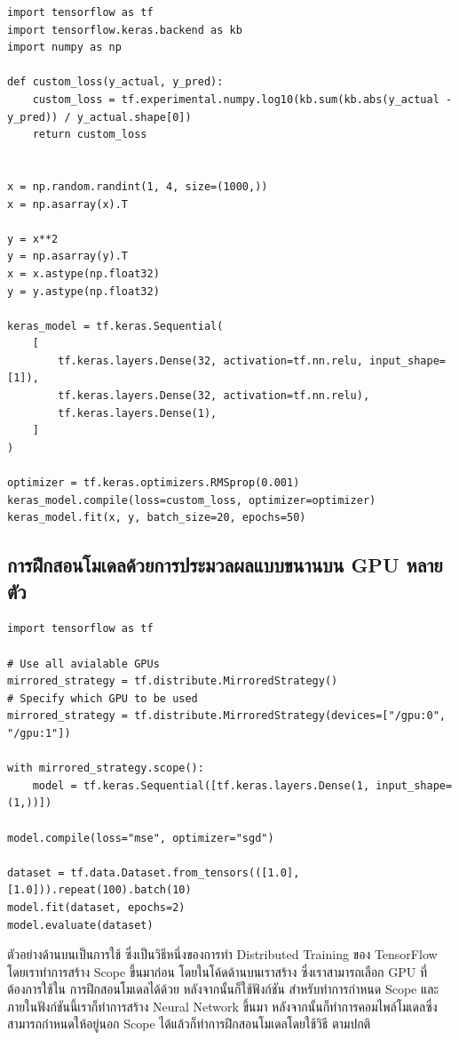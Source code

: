 \begin{lstlisting}[style=MyPython]
import tensorflow as tf
import tensorflow.keras.backend as kb
import numpy as np

def custom_loss(y_actual, y_pred):
    custom_loss = tf.experimental.numpy.log10(kb.sum(kb.abs(y_actual - y_pred)) / y_actual.shape[0])
    return custom_loss


x = np.random.randint(1, 4, size=(1000,))
x = np.asarray(x).T

y = x**2
y = np.asarray(y).T
x = x.astype(np.float32)
y = y.astype(np.float32)

keras_model = tf.keras.Sequential(
    [
        tf.keras.layers.Dense(32, activation=tf.nn.relu, input_shape=[1]),
        tf.keras.layers.Dense(32, activation=tf.nn.relu),
        tf.keras.layers.Dense(1),
    ]
)

optimizer = tf.keras.optimizers.RMSprop(0.001)
keras_model.compile(loss=custom_loss, optimizer=optimizer)
keras_model.fit(x, y, batch_size=20, epochs=50)
\end{lstlisting}

\subsection{การฝึกสอนโมเดลด้วยการประมวลผลแบบขนานบน GPU หลายตัว}

\begin{lstlisting}[style=MyPython]
import tensorflow as tf

# Use all avialable GPUs
mirrored_strategy = tf.distribute.MirroredStrategy()
# Specify which GPU to be used
mirrored_strategy = tf.distribute.MirroredStrategy(devices=["/gpu:0", "/gpu:1"])

with mirrored_strategy.scope():
    model = tf.keras.Sequential([tf.keras.layers.Dense(1, input_shape=(1,))])

model.compile(loss="mse", optimizer="sgd")

dataset = tf.data.Dataset.from_tensors(([1.0], [1.0])).repeat(100).batch(10)
model.fit(dataset, epochs=2)
model.evaluate(dataset)
\end{lstlisting}

ตัวอย่างด้านบนเป็นการใช้  ซึ่งเป็นวิธีหนึ่งของการทำ Distributed Training ของ TensorFlow 
โดยเราทำการสร้าง Scope ขึ้นมาก่อน โดยในโค้ดด้านบนเราสร้าง  ซึ่งเราสามารถเลือก GPU ที่ต้องการใช้ใน%
การฝึกสอนโมเดลได้ด้วย หลังจากนั้นก็ใช้ฟังก์ชัน  สำหรับทำการกำหนด Scope และภายในฟังก์ชันนี้เราก็ทำการสร้าง Neural 
Network ขึ้นมา หลังจากนั้นก็ทำการคอมไพล์โมเดลซึ่งสามารถกำหนดให้อยู่นอก Scope ได้แล้วก็ทำการฝึกสอนโมเดลโดยใช้วิธี 
ตามปกติ
